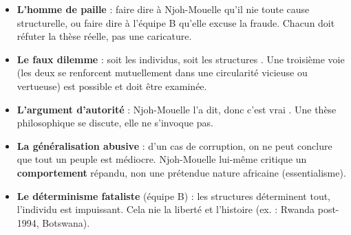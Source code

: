 \documentclass[11pt]{article}
\begin{document}
\begin{attention}
\begin{itemize}
\item \textbf{L'homme de paille} : faire dire à Njoh-Mouelle qu'il nie toute cause structurelle, ou faire dire à l'équipe B qu'elle excuse la fraude. Chacun doit réfuter la thèse réelle, pas une caricature.
\item \textbf{Le faux dilemme} : \guillemotleft soit les individus, soit les structures \guillemotright. Une troisième voie (les deux se renforcent mutuellement dans une circularité vicieuse ou vertueuse) est possible et doit être examinée.
\item \textbf{L'argument d'autorité} : \guillemotleft Njoh-Mouelle l'a dit, donc c'est vrai \guillemotright. Une thèse philosophique se discute, elle ne s'invoque pas.
\item \textbf{La généralisation abusive} : d'un cas de corruption, on ne peut conclure que tout un peuple est médiocre. Njoh-Mouelle lui-même critique un \textbf{comportement} répandu, non une prétendue \guillemotleft nature \guillemotright africaine (essentialisme).
\item \textbf{Le déterminisme fataliste} (équipe B) : les structures déterminent tout, l'individu est impuissant. Cela nie la liberté et l'histoire (ex. : Rwanda post-1994, Botswana).
\end{itemize}
\end{attention}
\end{document}
